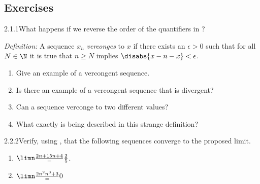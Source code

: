 \renewcommand{\theenumi}{\alph{enumi}}
\renewcommand{\labelenumi}{(\theenumi)}
\subsection{Exercises}

\begin{exercise}
    {2.1.1}What happens if we reverse the order of the quantifiers in ?

    \textit{Definition:} A sequence \(x_{n}\) \textit{verconges} to \(x\) if there exists an \(\epsilon >0\) such that for all \(N \in \N\) it is true that \(n \geq N\) implies \(\disabs{x-n - x} < \epsilon \).
    \begin{enumerate}
        \item Give an example of a vercongent sequence.
        \item Is there an example of a vercongent sequence that is divergent?
        \item Can a sequence verconge to two different values?
        \item What exactly is being described in this strange definition?
    \end{enumerate}
\end{exercise}


\begin{exercise}
    {2.2.2}Verify, using , that
    the following sequences converge to the proposed limit.
    \begin{enumerate}
        \item \(\limn \frac{2n + 1{5n + 4}} = \frac{2}{5}\).
        \item \(\limn \frac{2n^2{n^3+3}} = 0\)
    \end{enumerate}
\end{exercise}

